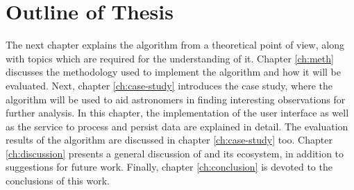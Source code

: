 \section{Outline of Thesis} \label{sect:intro:outline}

The next chapter explains the \mlblink algorithm from a theoretical point of view, along with topics which are required for the understanding of it. Chapter \ref{ch:meth} discusses the methodology used to implement the \mlblink algorithm and how it will be evaluated. Next, chapter \ref{ch:case-study} introduces the \mlblink case study, where the \mlblink algorithm will be used to aid astronomers in finding interesting observations for further analysis. In this chapter, the implementation of the user interface as well as the service to process and persist data are explained in detail. The evaluation results of the \mlblink algorithm are discussed in chapter \ref{ch:case-study} too. Chapter \ref{ch:discussion} presents a general discussion of \mlblink and its ecosystem, in addition to suggestions for future work. Finally, chapter \ref{ch:conclusion} is devoted to the conclusions of this work.